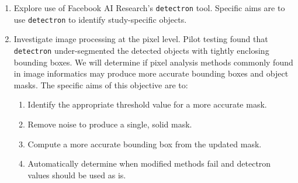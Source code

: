 \documentclass[conference]{IEEEtran}
\begin{document}
\begin{enumerate}
\item Explore use of Facebook AI Research's \verb|detectron| tool.  Specific
aims are to use \verb|detectron| to identify study-specific objects.

\item Investigate image processing at the pixel level.
Pilot testing found that \verb|detectron| under-segmented the detected objects
with tightly enclosing bounding boxes. We will determine if
pixel analysis methods commonly found in image informatics may produce
more accurate bounding boxes and object masks.
The specific aims of this objective are to:

\begin{enumerate}
\item
Identify the appropriate threshold value for a more accurate mask.

\item
Remove noise to produce a single, solid mask.

\item
Compute a more accurate bounding box from the updated mask.

\item
Automatically determine when modified methods fail and detectron values
should be used as is.
\end{enumerate}


\end{enumerate}
\end{document}
